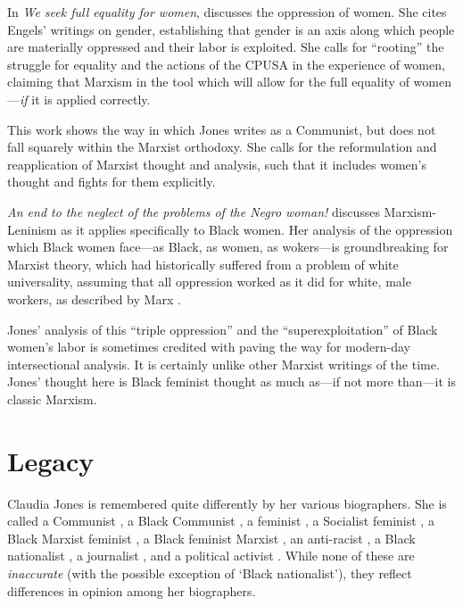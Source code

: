 \documentclass[man,12pt,natbib]{apa6}
\begin{document}
In \emph{We seek full equality for women}, \citet{Jones49b} discusses the
oppression of women. She cites Engels' writings on gender, establishing that
gender is an axis along which people are materially oppressed and their labor
is exploited. She calls for ``rooting'' the struggle for equality and the
actions of the CPUSA in the experience of women, claiming that Marxism in the
tool which will allow for the full equality of women---\emph{if} it is applied
correctly.

This work shows the way in which Jones writes as a Communist, but does not fall
squarely within the Marxist orthodoxy. She calls for the reformulation and
reapplication of Marxist thought and analysis, such that it includes women's
thought and fights for them explicitly.

\emph{An end to the neglect of the problems of the Negro woman!} \citep{Jones49a}
discusses Marxism-Leninism as it applies specifically to Black women. Her
analysis of the oppression which Black women face---as Black, as women, as
wokers---is groundbreaking for Marxist theory, which had historically suffered
from a problem of white universality, assuming that all oppression worked as it
did for white, male workers, as described by Marx \citep{Wilderson03}.

Jones' analysis of this ``triple oppression'' and the ``superexploitation''
\citep{Davies08} of Black women's labor is sometimes credited with paving the 
way for modern-day intersectional analysis. It is certainly unlike other
Marxist writings of the time. Jones' thought here is Black feminist thought
as much as---if not more than---it is classic Marxism.


\section{Legacy}

Claudia Jones is remembered quite differently by her various biographers. She
is called a Communist \cite{Lalkar, Davis15}, a Black Communist
\citep{Davies08, Howard13, McKittrick08}, a feminist \citep{Davis15,
McClendon96}, a Socialist feminist \cite{Lynn14}, a Black Marxist feminist
\citep{OBrien14}, a Black feminist Marxist \citep{Johnson08}, an anti-racist
\citep{Davis15}, a Black nationalist \citep{McClendon96}, a journalist
\citep{Hinds08, McClendon96}, and a political activist \citep{McClendon96}.
While none of these are \emph{inaccurate} (with the possible exception of
`Black nationalist'), they reflect differences in opinion among her
biographers.
\end{document}
